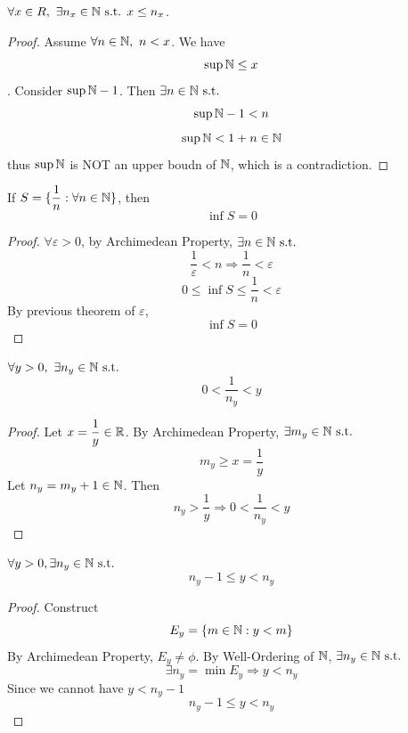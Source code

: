 \documentclass[a4paper,12pt]{article}
\begin{document}
\newpage

\begin{theorem}
    \(\forall x\in R,\ \exists n_x\in\mathbb{N}\text{ s.t. } x\le n_x\).
    \begin{proof}
        Assume \(\forall n\in\N,\ n<x\). We have \[\sup \mathbb{N}\le x\].
        Consider \(\sup \mathbb{N}-1\). Then \(\exists n\in\mathbb{N}\text{ s.t. } \)
        \[\sup\mathbb{N}-1<n\]
        \[\sup\mathbb{N}<1+n\in\mathbb{N}\]
        thus \(\sup\mathbb{N}\) is NOT an upper boudn of \(\mathbb{N}\), which is a contradiction.
    \end{proof}
\end{theorem}

\begin{corollary}
    If \(S=\{\dfrac{1}{n }:\forall n\in\mathbb{N}\}\), then
    \[\inf S=0\]
    \begin{proof}
        \(\forall \varepsilon>0\), by Archimedean Property, \(\exists n\in\mathbb{N}\text{ s.t. }\)
        \[\frac{1}{\varepsilon}<n\Rightarrow\frac{1}{n}<\varepsilon\]
        \[0\le \inf S\le\frac{1}{n }<\varepsilon\]
        By previous theorem of \(\varepsilon\), \[\inf S=0\]
    \end{proof}
\end{corollary}

\begin{corollary}
    \(\forall y>0,\ \exists n_y\in\mathbb{N}\text{ s.t. }\)
    \[0<\frac{1}{n_y }<y\]
    \begin{proof}
        Let \(x=\dfrac{1}{y }\in\mathbb{R}\). By Archimedean Property, \(\exists m_y\in\mathbb{N}\text{ s.t. }\)
        \[m_y\ge x=\frac{1}{y}\]
        Let \(n_y=m_y+1\in\mathbb{N}\). Then 
        \[n_y>\frac{1}{y}\Rightarrow0<\frac{1}{n_y }<y\]
    \end{proof}
\end{corollary}

\begin{corollary}
    \(\forall y>0,\exists n_y\in\mathbb{N}\text{ s.t. }\)
    \[n_y-1\le y<n_y\]
    \begin{proof}
        Construct \[E_y=\{m\in\mathbb{N}:y<m\}\]
        By Archimedean Property, \(E_y\neq\phi\).
        By Well-Ordering of \(\mathbb{N}\), \(\exists n_y\in\mathbb{N}\text{ s.t. }\)
        \[\exists n_y=\min E_y\Rightarrow y<n_y\]
        Since we cannot have \(y<n_y-1\)
        \[n_y-1\le y<n_y\]
    \end{proof}
\end{corollary}
\end{document}
